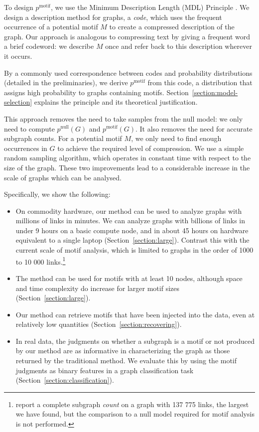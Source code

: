 \documentclass[twoside,11pt]{article}
\begin{document}
To design $p^\text{motif}$, we use the Minimum Description Length (MDL) Principle \citep{rissanen1978modeling,grunwald2007minimum}. We design a description method for graphs, a \emph{code}, which uses the frequent occurrence of a potential motif $M$ to create a compressed description of the graph. Our approach is analogous to compressing text by giving a frequent word a brief codeword: we describe $M$ once and refer back to this description wherever it occurs. 

By a commonly used correspondence between codes and probability distributions (detailed in the preliminaries), we derive $p^\text{motif}$ from this code, a distribution that assigns high probability to graphs containing motifs. Section~\ref{section:model-selection} explains the principle and its theoretical justification.

This approach removes the need to take samples from the null model: we only need to compute $p^\text{null}(G)$ and $p^\text{motif}(G)$. It also removes the need for accurate subgraph counts. For a potential motif $M$, we only need to find enough occurrences in  $G$ to achieve the required level of compression. We use a simple random sampling algorithm, which operates in constant time with respect to the size of the graph. These two improvements lead to a considerable increase in the scale of graphs which can be analysed. 

Specifically, we show the following:
\begin{itemize}
  \item On commodity hardware, our method can be used to analyze graphs with millions of links in minutes. We can analyze graphs with billions of links in under 9 hours on a basic compute node, and in about 45 hours on hardware equivalent to a single laptop (Section~\ref{section:large}). Contrast this with the current scale of motif analysis, which is limited to graphs in the order of 1000 to 10 000 links.\footnote{\citet{hovcevar2014combinatorial} report a complete subgraph \emph{count} on a graph with 137 775 links, the largest we have found, but the comparison to a null model required for motif analysis is not performed.}
  \item The method can be used for motifs with at least 10 nodes, although space and time complexity do increase for larger motif sizes (Section~\ref{section:large}).  
  \item Our method can retrieve motifs that have been injected into the data, even at relatively low quantities (Section~\ref{section:recovering}).
  \item In real data, the judgments on whether a subgraph is a motif or not produced by our method are as informative in characterizing the graph as those returned by the traditional method. We evaluate this by using the motif judgments as binary features in a graph classification task (Section~\ref{section:classification}). 
\end{itemize}
\end{document}
